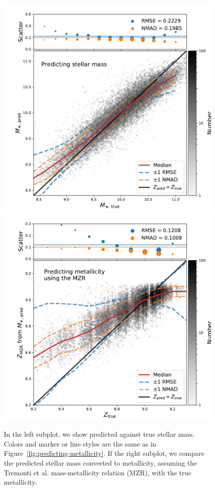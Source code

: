 \documentclass[fleqn,usenatbib]{mnras}
\begin{document}
\begin{figure}
	\includegraphics[width=\columnwidth]{05-a-prediction_mass.pdf}
	\includegraphics[width=\columnwidth]{05-b-prediction_mzr.pdf}
	\caption{\label{fig:mass-metallicity}
		In the left subplot, we show predicted against true stellar mass. 
		Colors and marker or line styles are the same as in Figure~\ref{fig:predicting-metallicity}.
		If the right subplot, we compare the predicted stellar mass converted to metallicity, assuming the Tremonti et al. mass-metallicity relation (MZR), with the true metallicity.}
\end{figure}
\end{document}
